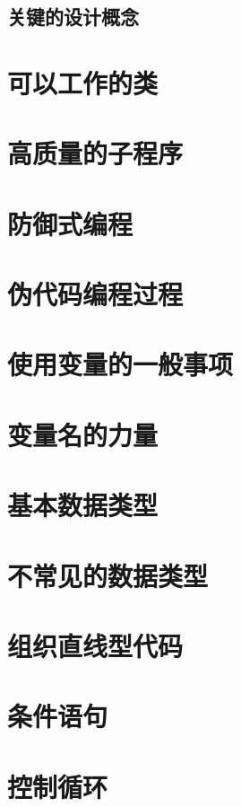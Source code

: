 \documentclass{article}
\begin{document}
\subsection{关键的设计概念}


\section{可以工作的类}

\section{高质量的子程序}

\section{防御式编程}

\section{伪代码编程过程}

\section{使用变量的一般事项}

\section{变量名的力量}


\section{基本数据类型}

\section{不常见的数据类型}

\section{组织直线型代码}

\section{条件语句}

\section{控制循环}
\end{document}
